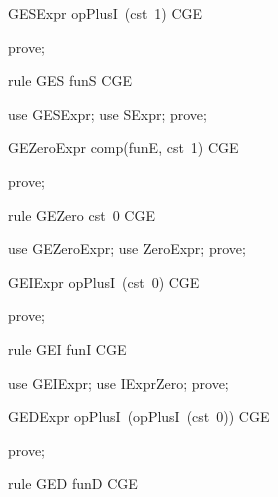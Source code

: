 \documentclass{article}
\begin{document}
\begin{theorem}{GESExpr}
  opPlusI~(cst~1) \in CGE
\end{theorem}

\begin{zproof}
prove;
\end{zproof}

\begin{theorem}{rule GES}
  funS \in CGE
\end{theorem}

\begin{zproof}
use GESExpr;
use SExpr;
prove;
\end{zproof}

\begin{theorem}{GEZeroExpr}
  comp(funE, cst~1) \in CGE
\end{theorem}

\begin{zproof}
prove;
\end{zproof}

\begin{theorem}{rule GEZero}
  cst~0 \in CGE
\end{theorem}

\begin{zproof}
use GEZeroExpr;
use ZeroExpr;
prove;
\end{zproof}

\begin{theorem}{GEIExpr}
  opPlusI~(cst~0) \in CGE
\end{theorem}

\begin{zproof}
prove;
\end{zproof}

\begin{theorem}{rule GEI}
  funI \in CGE
\end{theorem}

\begin{zproof}
use GEIExpr;
use IExprZero;
prove;
\end{zproof}

\begin{theorem}{GEDExpr}
  opPlusI~(opPlusI~(cst~0)) \in CGE
\end{theorem}

\begin{zproof}
prove;
\end{zproof}

\begin{theorem}{rule GED}
  funD \in CGE
\end{theorem}
\end{document}
